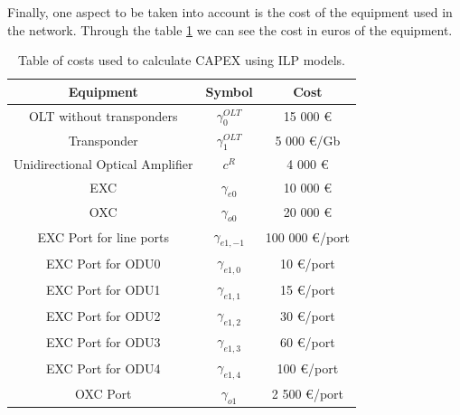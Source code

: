 \vspace{13pt}

Finally, one aspect to be taken into account is the cost of the equipment used in the network. Through the table \ref{table_cost_ilp} we can see the cost in euros of the equipment.\\

\begin{table}[h!]
\centering
\begin{tabular}{|| c | c | c||}
 \hline
 Equipment & Symbol & Cost \\
 \hline\hline
 OLT without transponders & $\gamma_0^{OLT}$ & 15 000 \euro \\
 Transponder & $\gamma_1^{OLT}$ & 5 000 \euro/Gb \\
 Unidirectional Optical Amplifier & $c^R$ & 4 000 \euro \\
 EXC & $\gamma_{e0}$ & 10 000 \euro \\
 OXC & $\gamma_{o0}$ & 20 000 \euro \\
 EXC Port for line ports & $\gamma_{e1,-1}$ & 100 000 \euro /port\\
 EXC Port for ODU0 & $\gamma_{e1,0}$ & 10 \euro /port\\
 EXC Port for ODU1 & $\gamma_{e1,1}$ & 15 \euro /port\\
 EXC Port for ODU2 & $\gamma_{e1,2}$ & 30 \euro /port\\
 EXC Port for ODU3 & $\gamma_{e1,3}$ & 60 \euro /port\\
 EXC Port for ODU4 & $\gamma_{e1,4}$ & 100 \euro /port\\
 OXC Port & $\gamma_{o1}$ & 2 500 \euro /port \\
 \hline
\end{tabular}
\caption{Table of costs used to calculate CAPEX using ILP models.}
\label{table_cost_ilp}
\end{table}

